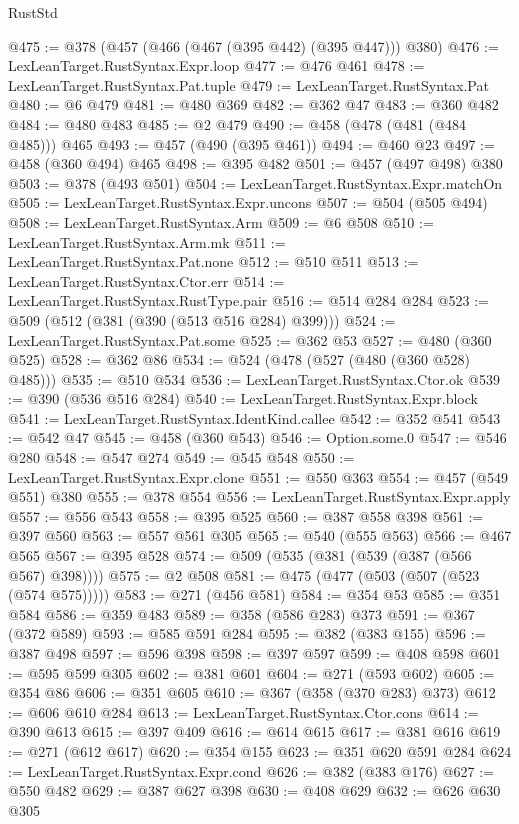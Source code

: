 \begin{lexlean}{RustStd}
\begin{coremodule}
@475 := @378 (@457 (@466 (@467 (@395 @442) (@395 @447))) @380)
@476 := LexLeanTarget.RustSyntax.Expr.loop
@477 := @476 @461
@478 := LexLeanTarget.RustSyntax.Pat.tuple
@479 := LexLeanTarget.RustSyntax.Pat
@480 := @6 @479
@481 := @480 @369
@482 := @362 @47
@483 := @360 @482
@484 := @480 @483
@485 := @2 @479
@490 := @458 (@478 (@481 (@484 @485))) @465
@493 := @457 (@490 (@395 @461))
@494 := @460 @23
@497 := @458 (@360 @494) @465
@498 := @395 @482
@501 := @457 (@497 @498) @380
@503 := @378 (@493 @501)
@504 := LexLeanTarget.RustSyntax.Expr.matchOn
@505 := LexLeanTarget.RustSyntax.Expr.uncons
@507 := @504 (@505 @494)
@508 := LexLeanTarget.RustSyntax.Arm
@509 := @6 @508
@510 := LexLeanTarget.RustSyntax.Arm.mk
@511 := LexLeanTarget.RustSyntax.Pat.none
@512 := @510 @511
@513 := LexLeanTarget.RustSyntax.Ctor.err
@514 := LexLeanTarget.RustSyntax.RustType.pair
@516 := @514 @284 @284
@523 := @509 (@512 (@381 (@390 (@513 @516 @284) @399)))
@524 := LexLeanTarget.RustSyntax.Pat.some
@525 := @362 @53
@527 := @480 (@360 @525)
@528 := @362 @86
@534 := @524 (@478 (@527 (@480 (@360 @528) @485)))
@535 := @510 @534
@536 := LexLeanTarget.RustSyntax.Ctor.ok
@539 := @390 (@536 @516 @284)
@540 := LexLeanTarget.RustSyntax.Expr.block
@541 := LexLeanTarget.RustSyntax.IdentKind.callee
@542 := @352 @541
@543 := @542 @47
@545 := @458 (@360 @543)
@546 := Option.some.{0}
@547 := @546 @280
@548 := @547 @274
@549 := @545 @548
@550 := LexLeanTarget.RustSyntax.Expr.clone
@551 := @550 @363
@554 := @457 (@549 @551) @380
@555 := @378 @554
@556 := LexLeanTarget.RustSyntax.Expr.apply
@557 := @556 @543
@558 := @395 @525
@560 := @387 @558 @398
@561 := @397 @560
@563 := @557 @561 @305
@565 := @540 (@555 @563)
@566 := @467 @565
@567 := @395 @528
@574 := @509 (@535 (@381 (@539 (@387 (@566 @567) @398))))
@575 := @2 @508
@581 := @475 (@477 (@503 (@507 (@523 (@574 @575)))))
@583 := @271 (@456 @581)
@584 := @354 @53
@585 := @351 @584
@586 := @359 @483
@589 := @358 (@586 @283) @373
@591 := @367 (@372 @589)
@593 := @585 @591 @284
@595 := @382 (@383 @155)
@596 := @387 @498
@597 := @596 @398
@598 := @397 @597
@599 := @408 @598
@601 := @595 @599 @305
@602 := @381 @601
@604 := @271 (@593 @602)
@605 := @354 @86
@606 := @351 @605
@610 := @367 (@358 (@370 @283) @373)
@612 := @606 @610 @284
@613 := LexLeanTarget.RustSyntax.Ctor.cons
@614 := @390 @613
@615 := @397 @409
@616 := @614 @615
@617 := @381 @616
@619 := @271 (@612 @617)
@620 := @354 @155
@623 := @351 @620 @591 @284
@624 := LexLeanTarget.RustSyntax.Expr.cond
@626 := @382 (@383 @176)
@627 := @550 @482
@629 := @387 @627 @398
@630 := @408 @629
@632 := @626 @630 @305

\end{coremodule}
\end{lexlean}
